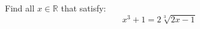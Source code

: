 Find all $x \in \mathbb{R}$ that satisfy:
\begin{equation*}
  x^3 + 1 = 2 \sqrt[3]{2 x - 1}
\end{equation*}
